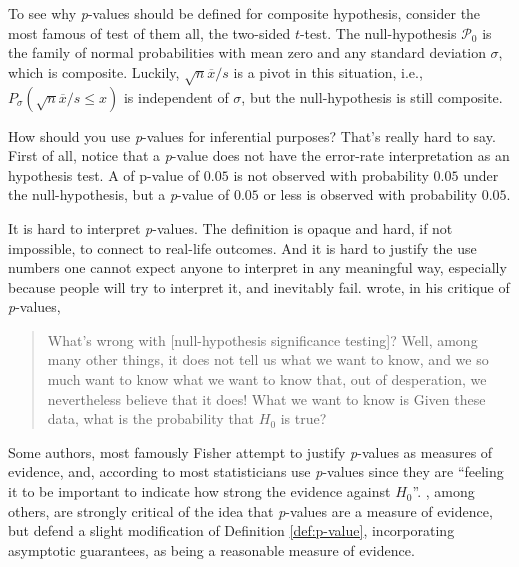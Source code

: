 To see why \emph{p}-values should be defined for composite hypothesis,
consider the most famous of test of them all, the two-sided $t$-test.
The null-hypothesis $\mathcal{P}_{0}$ is the family of normal probabilities
with mean zero and any standard deviation $\sigma$, which is composite.
Luckily, $\sqrt{n}\overline{x}/s$ is a pivot in this situation, i.e.,
$P_{\sigma}(\sqrt{n}\overline{x}/s\leq x)$ is independent of $\sigma$,
but the null-hypothesis is still composite. 

How should you use \emph{p}-values for inferential purposes? That's
really hard to say. First of all, notice that a \emph{p}-value does
not have the error-rate interpretation as an hypothesis test. A of
p-value of $0.05$ is not observed with probability $0.05$ under
the null-hypothesis, but a \emph{p}-value of $0.05$ or less is observed
with probability $0.05$. 

It is hard to interpret \emph{p}-values. The definition is opaque and hard, if not impossible, to connect to real-life outcomes. And it is hard to justify the use numbers one cannot expect anyone to interpret in any meaningful way, especially because people will try to interpret it, and inevitably fail. \textcite{Cohen1994-au} wrote, in his critique of \emph{p}-values, 
\begin{quotation}
What's wrong with {[}null-hypothesis significance testing{]}? Well,
among many other things, it does not tell us what we want to know,
and we so much want to know what we want to know that, out of desperation,
we nevertheless believe that it does! What we want to know is \textquotedbl Given
these data, what is the probability that $H_{0}$ is true?\textquotedbl{}
\end{quotation}
Some authors, most famously Fisher \parencite{Liu2020-er} attempt to justify \emph{p}-values
as measures of evidence, and, according to \textcite{Berger1987-tf}
most statisticians use \emph{p}-values since they are ``feeling it
to be important to indicate how strong the evidence against $H_{0}$''.
\textcite{Hubbard2008-cg}, among others, are strongly critical of the
idea that \emph{p}-values are a measure of evidence, but \textcite{Liu2020-er} defend a slight modification of Definition \ref{def:p-value}, incorporating asymptotic guarantees, as being a reasonable measure of evidence.

